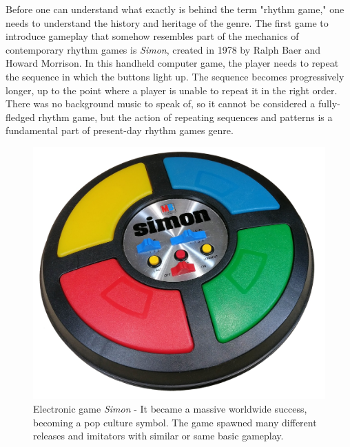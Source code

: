 Before one can understand what exactly is behind the term "rhythm game," one needs to understand the history and heritage of the genre. The first game to introduce gameplay that somehow resembles part of the mechanics of contemporary rhythm games is \textit{Simon}, created in 1978 by Ralph Baer and Howard Morrison. In this handheld computer game, the player needs to repeat the sequence in which the buttons light up. The sequence becomes progressively longer, up to the point where a player is unable to repeat it in the right order. There was no background music to speak of, so it cannot be considered a fully-fledged rhythm game, but the action of repeating sequences and patterns is a fundamental part of present-day rhythm games genre.

\begin{figure}[h]
    \centering\includegraphics[scale=0.15]{obrazki/simon.jpg}
    \caption{Electronic game \textit{Simon} - It became a massive worldwide success, becoming a pop culture symbol. The game spawned many different releases and imitators with similar or same basic gameplay. \cite{simongame}}
    \label{fig:simon_game}
\end{figure}

